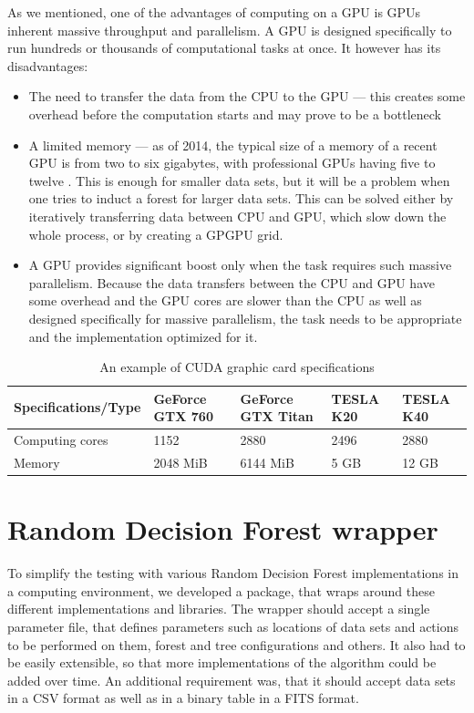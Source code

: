 \documentclass[thesis=B,english]{FITthesis}[2012/10/20]
\begin{document}
	As we mentioned, one of the advantages of computing on a GPU is GPUs inherent massive throughput and parallelism. A GPU is designed specifically to run hundreds or thousands of computational tasks at once. It however has its disadvantages: 
	\begin{itemize}
	\item The need to transfer the data from the CPU to the GPU --- this creates some overhead before the computation starts and may prove to be a bottleneck
	\item A limited memory --- as of 2014, the typical size of a memory of a recent GPU is from two to six gigabytes, with professional GPUs having five to twelve . This is enough for smaller data sets, but it will be a problem when one tries to induct a forest for larger data sets. This can be solved either by iteratively transferring data between CPU and GPU, which slow down the whole process, or by creating a GPGPU grid.
	\item A GPU provides significant boost only when the task requires such massive parallelism. Because the data transfers between the CPU and GPU have some overhead and the GPU cores are slower than the CPU as well as designed specifically for massive parallelism, the task needs to be appropriate and the implementation optimized for it.
	\end{itemize}

	\begin{table}
    \begin{tabular}{|l|l|l|l|l|}
    \hline
    Specifications/Type & GeForce GTX 760 & GeForce GTX Titan & TESLA K20 & TESLA K40 \\ \hline
    Computing cores     & 1152            & 2880              & 2496             & 2880             \\ \hline
    Memory              & 2048 MiB        & 6144 MiB          & 5 GB             & 12 GB            \\ \hline
    \end{tabular}
    \caption{An example of CUDA graphic card specifications}
	\end{table}
\chapter{Random Decision Forest wrapper}
\label{chap:wrapper}
To simplify the testing with various Random Decision Forest implementations in a computing environment, we developed a package, that wraps around these different implementations and libraries. The wrapper should accept a single parameter file, that defines parameters such as locations of data sets and actions to be performed on them, forest and tree configurations and others. It also had to be easily extensible, so that more implementations of the algorithm could be added over time. An additional requirement was, that it should accept data sets in a CSV format as well as in a binary table in a FITS format.
\end{document}
